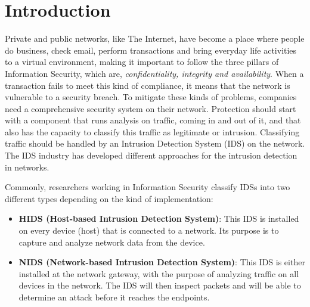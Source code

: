 \documentclass[conference]{IEEEtran}
\begin{document}





%
\IEEEpeerreviewmaketitle

\section{Introduction}
Private and public networks, like The Internet, have become a place where people do business, check email, perform transactions and bring everyday life activities to a virtual environment, making it important to follow the three pillars of Information Security, which are, \emph{confidentiality, integrity and availability}.  When a transaction fails to meet this kind of compliance, it means that the network is vulnerable to a security breach. To mitigate these kinds of problems, companies need a comprehensive security system on their network. Protection should start with a component that runs analysis on traffic, coming in and out of it, and that also has the capacity to classify this traffic as legitimate or intrusion. Classifying traffic should be handled by an Intrusion Detection System (IDS) on the network. The IDS industry has developed different approaches for the intrusion detection in networks.  %

Commonly, researchers working in Information Security \cite{deshmukhDetectionOfAttacks} \cite{chen2010efficientnetworkintrusion} classify IDSs into two different types depending on the kind of implementation:
\begin{itemize}
\item \textbf{HIDS (Host-based Intrusion Detection System)}:  This IDS is installed on every device (host) that is connected to a network.  Its purpose is to capture and analyze network data from the device.  
\item \textbf{NIDS (Network-based Intrusion Detection System)}: This IDS is either installed at the network gateway, with the purpose of analyzing traffic on all devices in the network.  The IDS will then inspect packets and will be able to determine an attack before it reaches the endpoints.
\end{itemize}
\end{document}
